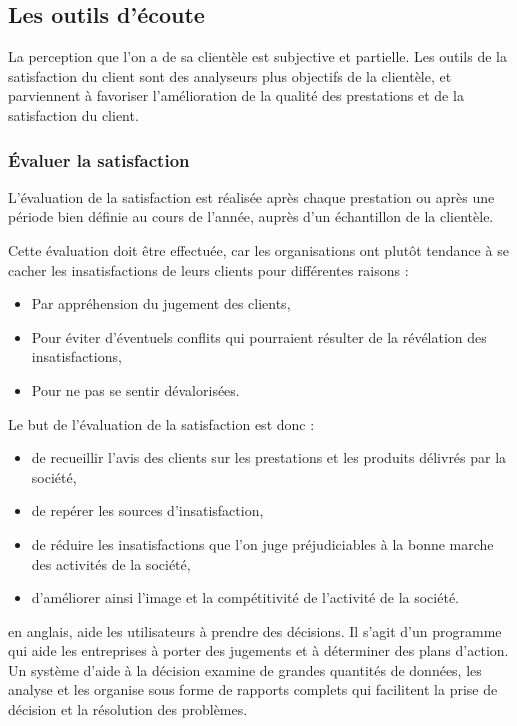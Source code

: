         \subsection[Les outils d’écoute]{Les outils d’écoute}
        La perception que l’on a de sa clientèle est subjective et partielle.
        Les outils de la satisfaction du client sont des analyseurs plus objectifs de la clientèle, 
        et parviennent à favoriser l’amélioration de la qualité des prestations et de la satisfaction du
        client.
            \subsubsection[Évaluer la satisfaction]{Évaluer la satisfaction}
            L’évaluation de la satisfaction est réalisée après chaque prestation ou après une période
            bien définie au cours de l’année, auprès d’un échantillon de la clientèle.
            \par
            Cette évaluation doit être effectuée, car les organisations ont plutôt
            tendance à se cacher les insatisfactions de leurs clients pour différentes raisons :
            \par    
                \begin{itemize}
                    \setlength{\itemsep}{0pt}
                    \item [\ding{226}] Par appréhension du jugement des clients,
                    \item [\ding{226}] Pour éviter d’éventuels conflits qui pourraient
                    résulter de la révélation des insatisfactions,
                    \item [\ding{226}] Pour ne pas se sentir dévalorisées.
                \end{itemize}
            Le but de l’évaluation de la satisfaction est donc :
            \par
                \begin{itemize}
                    \setlength{\itemsep}{0pt}
                    \item [\ding{226}] de recueillir l’avis des clients sur les prestations
                    et les produits délivrés par la société,
                    \item [\ding{226}] de repérer les sources d’insatisfaction,
                    \item [\ding{226}] de réduire les insatisfactions que l’on juge
                    préjudiciables à la bonne marche des activités de la société,
                    \item [\ding{226}] d’améliorer ainsi l’image et la compétitivité de l’activité
                    de la société.
                \end{itemize}
        en anglais, aide les utilisateurs à prendre des décisions.
        Il s’agit d’un programme qui aide les entreprises à porter des jugements
        et à déterminer des plans d’action.
        Un système d’aide à la décision examine
        de grandes quantités de données, les analyse et les organise sous forme
        de rapports complets qui facilitent la prise de décision et
        la résolution des problèmes. \cite*{SAD}
